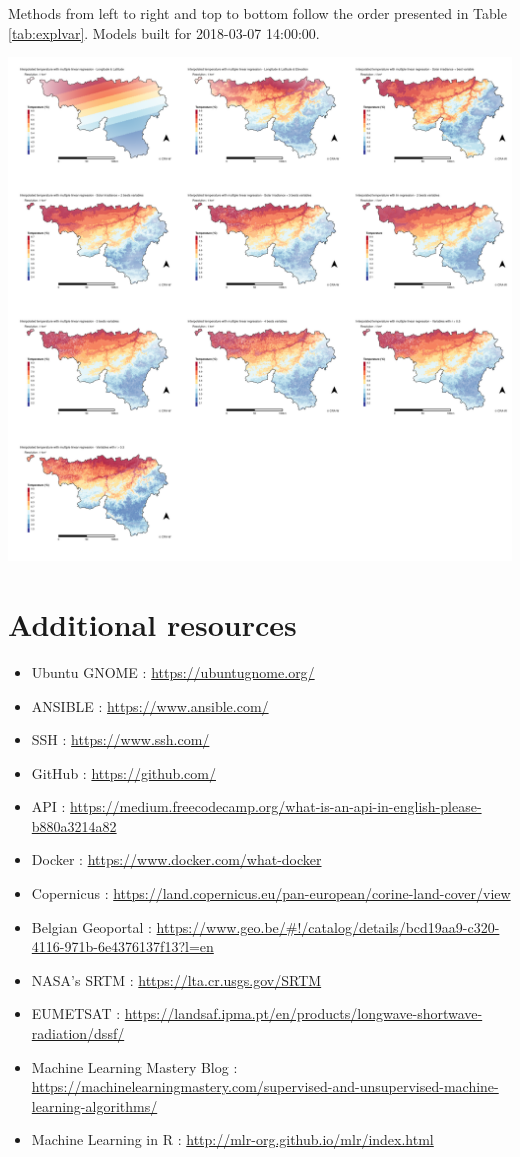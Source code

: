 \documentclass[12pt,twoside]{reedthesis}
\theoremstyle{definition}
\theoremstyle{definition}
\theoremstyle{definition}
\theoremstyle{remark}
\begin{document}
Methods from left to right and top to bottom follow the order presented
in Table \ref{tab:explvar}. Models built for 2018-03-07 14:00:00.
\begin{center}\includegraphics[width=1\linewidth]{figure/2018-03-07_14} \end{center}

\chapter{Additional resources}\label{additional-resources}
\begin{itemize}
\item
  Ubuntu GNOME : \url{https://ubuntugnome.org/}
\item
  ANSIBLE : \url{https://www.ansible.com/}
\item
  SSH : \url{https://www.ssh.com/}
\item
  GitHub : \url{https://github.com/}
\item
  API :
  \url{https://medium.freecodecamp.org/what-is-an-api-in-english-please-b880a3214a82}
\item
  Docker : \url{https://www.docker.com/what-docker}
\item
  Copernicus :
  \url{https://land.copernicus.eu/pan-european/corine-land-cover/view}
\item
  Belgian Geoportal :
  \url{https://www.geo.be/\#!/catalog/details/bcd19aa9-c320-4116-971b-6e4376137f13?l=en}
\item
  NASA's SRTM : \url{https://lta.cr.usgs.gov/SRTM}
\item
  EUMETSAT :
  \url{https://landsaf.ipma.pt/en/products/longwave-shortwave-radiation/dssf/}
\item
  Machine Learning Mastery Blog :
  \url{https://machinelearningmastery.com/supervised-and-unsupervised-machine-learning-algorithms/}
\item
  Machine Learning in R : \url{http://mlr-org.github.io/mlr/index.html}
\end{itemize}
\backmatter
\end{document}
